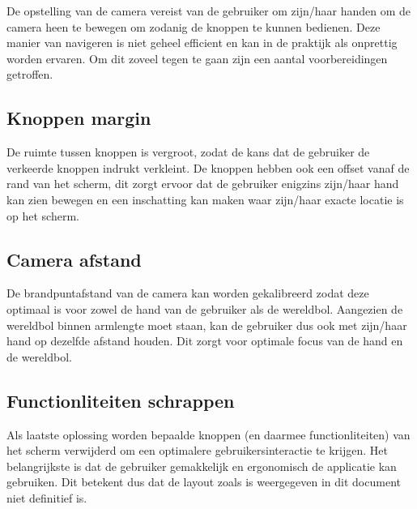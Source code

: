 De opstelling van de camera vereist van de gebruiker om zijn/haar handen om de camera heen te bewegen om zodanig de knoppen te kunnen bedienen. Deze manier van navigeren is niet geheel efficient en kan in de praktijk als onprettig worden ervaren. Om dit zoveel tegen te gaan zijn een aantal voorbereidingen getroffen.
\subsection{Knoppen margin} \label{subsec:margin}
De ruimte tussen knoppen is vergroot, zodat de kans dat de gebruiker de verkeerde knoppen indrukt verkleint. De knoppen hebben ook een offset vanaf de rand van het scherm, dit zorgt ervoor dat de gebruiker enigzins zijn/haar hand kan zien bewegen en een inschatting kan maken waar zijn/haar exacte locatie is op het scherm.
\subsection{Camera afstand} \label{subsec:cameraafstand}
De brandpuntafstand van de camera kan worden gekalibreerd zodat deze optimaal is voor zowel de hand van de gebruiker als de wereldbol. Aangezien de wereldbol binnen armlengte moet staan, kan de gebruiker dus ook met zijn/haar hand op dezelfde afstand houden. Dit zorgt voor optimale focus van de hand en de wereldbol.
\subsection{Functionliteiten schrappen} \label{subsec:scrap}
Als laatste oplossing worden bepaalde knoppen (en daarmee functionliteiten) van het scherm verwijderd om een optimalere gebruikersinteractie te krijgen. Het belangrijkste is dat de gebruiker gemakkelijk en ergonomisch de applicatie kan gebruiken. Dit betekent dus dat de layout zoals is weergegeven in dit document niet definitief is.